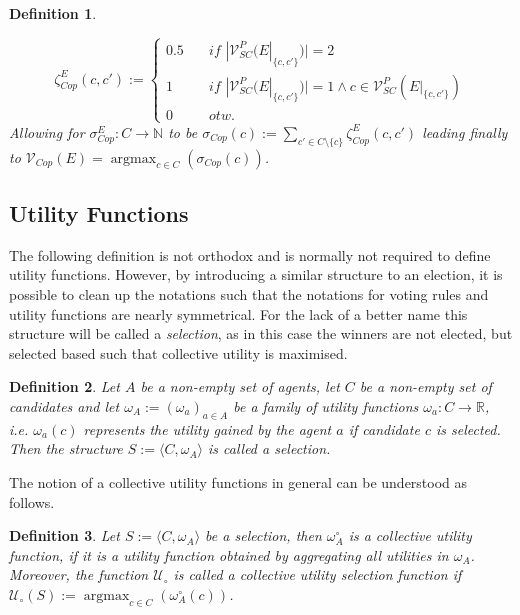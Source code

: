 \documentclass[11pt,a4paper]{article}
\newtheorem{mydef}{Definition}
\newcommand{\util}{\omega}
\DeclareMathOperator*{\argmax}{argmax}
\begin{document}
\begin{mydef}
\begin{itemize}
\begin{equation*}
\zeta_{Cop}^E(c,c'):=
\begin{cases}
0.5 & \quad \textit{if } |\mathcal{V}_{SC}^P(E|_{\{c,c'\}})| = 2 \\
1 & \quad \textit{if } |\mathcal{V}_{SC}^P(E|_{\{c,c'\}})| = 1 \land c \in \mathcal{V}_{SC}^P(E|_{\{c,c'\}}) \\
0 & \quad \textit{otw.}
\end{cases}
\end{equation*}
Allowing for $\sigma_{Cop}^E: C \to \mathbb{N}$ to be $\sigma_{Cop}(c):= \sum_{c' \in C\setminus \{c\}} \zeta_{Cop}^{E}(c,c')$ leading finally to $\mathcal{V}_{Cop}(E)=\argmax_{c \in C} (\sigma_{Cop}(c))$.
\end{itemize}
\end{mydef} 


\subsection{Utility Functions}
The following definition is not orthodox and is normally not required to define utility functions. However, by introducing a similar structure to an election, it is possible to clean up the notations such that the notations for voting rules and utility functions are nearly symmetrical. For the lack of a better name this structure will be called a \emph{selection}, as in this case the winners are not elected, but selected based such that collective utility is maximised.   

\begin{mydef}
\label{def:selection}
Let $A$ be a non-empty set of \emph{agents}, let $C$ be a non-empty set of \emph{candidates} and let $\util_A := (\omega_a)_{a \in A}$ be a family of \emph{utility functions} $\util_a: C \to \mathbb{R}$, i.e. $\util_a(c)$ represents the utility gained by the agent $a$ if candidate $c$ is selected. Then the structure $S:=\langle C, \util_A \rangle$ is called a \emph{selection}.
\end{mydef} 


The notion of a collective utility functions in general can be understood as follows. 

\begin{mydef}
\label{def:collective_utility_general}
Let $S:=\langle C, \util_A\rangle$ be a selection, then $\omega_A^{\circ}$ is a collective utility function, if it is a utility function obtained by aggregating all utilities in $\omega_A$. Moreover, the function $\mathcal{U}_{\circ}$ is called a \emph{collective utility selection function} if $\mathcal{U}_{\circ}(S):= \argmax_{c \in C}(\omega_A^{\circ}(c))$. 
\end{mydef} 
\end{document}
